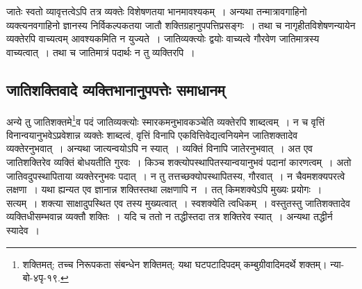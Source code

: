 			जातेः स्वतो व्यावृत्तत्वेऽपि तत्र व्यक्तेः विशेषणतया भानमावश्यकम्~। अन्यथा तन्मात्रावगाहिनो व्यक्त्यनवगाहिनो ज्ञानस्य निर्विकल्पकतया जातौ शक्तिग्रहानुपपत्तिप्रसङ्गः~। तथा च नागृहीतविशेषणन्यायेन व्यक्तेरपि वाच्यत्वम् आवश्यकमिति न युज्यते~। जातिव्यक्त्योः द्वयोः वाच्यत्वे गौरवेण जातिमात्रस्य वाच्यत्वात्~। तथा च जातिमात्रं पदार्थः न तु व्यक्तिरपि~।

		\subsection{जातिशक्तिवादे व्यक्तिभानानुपपत्तेः समाधानम्}

			\begin{small}
	
				अन्ये तु जातिशक्तमे\footnote{शक्तिमत्; तच्च निरूपकता संबन्धेन शक्तिमत्; यथा घटपटादिपदम् कम्बुग्रीवादिमदर्थे शक्तम्। न्या-बो-४पृ-१९.}व पदं जातिव्यक्त्योः स्मारकमनुभावकञ्चेति व्यक्तेरपि शाब्दत्वम्~। न च वृत्तिं विनान्वयानुभवेऽप्रवेशान्न व्यक्तेः शाब्दत्वं, वृत्तिं विनापि एकवित्तिवेद्यत्वनियमेन जातिशक्तादेव व्यक्तेरनुभवात्~। अन्यथा जात्यन्वयोऽपि न स्यात्~। व्यक्तिं विनापि जातेरनुभवात्~। अत एव जातिशक्तिरेव व्यक्तिं बोधयतीति गुरवः~। किञ्च शक्त्योपस्थापितस्यान्वयानुभवं पदानां कारणत्वम्~। अतो जातिवदुपस्थापिताया व्यक्तेरनुभवः पदात्~। न तु तत्तच्छक्योपस्थापितस्य, गौरवात्~। न चैवमशक्यपरत्वे लक्षणा~। यथा ह्यन्यत एव ज्ञानान्न शक्तिस्तथा लक्षणापि न~। तत् किमशक्येऽपि मुख्यः प्रयोगः~। सत्यम्~। शक्त्या साक्षादुपस्थित एव तस्य मुख्यत्वात्~। स्वशक्येति त्वधिकम्~। वस्तुतस्तु जातिशक्तादेव व्यक्तिधीसम्भवान्न व्यक्तौ शक्तिः~। यदि च ततो न तद्धीस्तदा तत्र शक्तिरेव स्यात्~। अन्यथा तद्धीर्न स्यादेव~। 
			\end{small}

